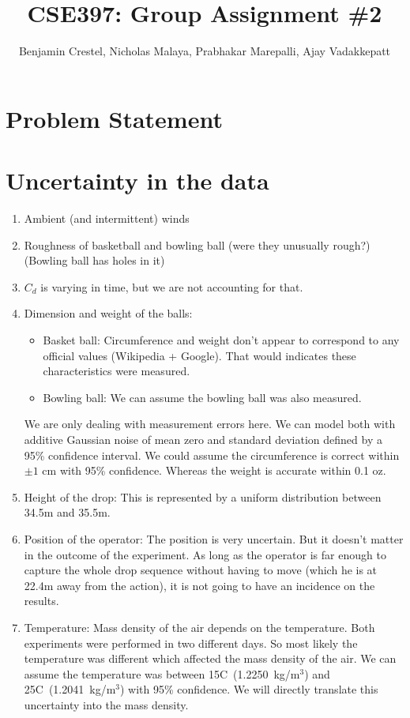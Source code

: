 \documentclass{article}
\title{\bf{CSE397: Group Assignment \#2}}
\author{Benjamin Crestel, Nicholas Malaya, Prabhakar Marepalli, Ajay Vadakkepatt}
\date{}
\begin{document}
\maketitle

\newpage
\section*{Problem Statement}

\section{Uncertainty in the data}
\begin{enumerate}
 \item Ambient (and intermittent) winds
 \item Roughness of basketball and bowling ball (were they unusually
       rough?) (Bowling ball has holes in it)
 \item $C_d$ is varying in time, but we are not accounting for that.
 \item Dimension and weight of the balls:
\begin{itemize}
 \item Basket ball: Circumference and weight don't appear to correspond to any official values (Wikipedia + Google). That would indicates these characteristics were measured.
 \item Bowling ball: We can assume the bowling ball was also measured.
\end{itemize}
We are only dealing with measurement errors here. We can model both with additive Gaussian noise of mean zero and standard deviation defined by a 95\% confidence interval. We could assume the circumference is correct within $\pm 1$ cm with 95\% confidence. Whereas the weight is accurate within 0.1 oz.
 \item Height of the drop: This is represented by a uniform distribution between 34.5m and 35.5m.
 \item Position of the operator: The position is very uncertain. But it doesn't matter in the outcome of the experiment. As long as the operator is far enough to capture the whole drop sequence without having to move (which he is at 22.4m away from the action), it is not going to have an incidence on the results.
 \item Temperature: Mass density of the air depends on the temperature. Both experiments were performed in two different days. So most likely the temperature was different which affected the mass density of the air. We can assume the temperature was between 15C~(1.2250~kg/m$^3$) and 25C~(1.2041~kg/m$^3$) with 95\% confidence. We will directly translate this uncertainty into the mass density.

\end{enumerate}
\end{document}
